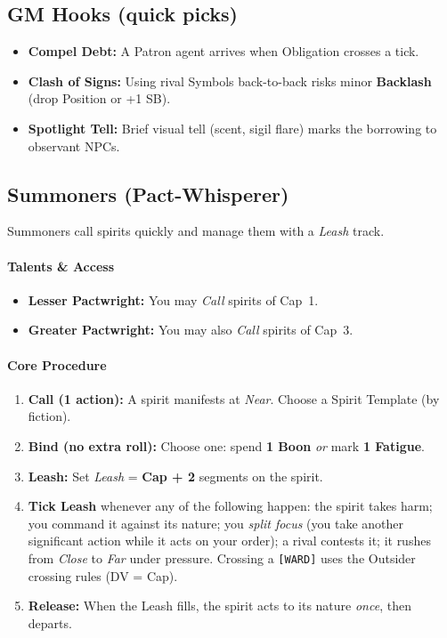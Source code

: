 \subsection*{GM Hooks (quick picks)}
\begin{itemize}
  \item \textbf{Compel Debt:} A Patron agent arrives when Obligation crosses a tick.
  \item \textbf{Clash of Signs:} Using rival Symbols back-to-back risks minor \textbf{Backlash} (drop Position or +1 SB).
  \item \textbf{Spotlight Tell:} Brief visual tell (scent, sigil flare) marks the borrowing to observant NPCs.
\end{itemize}

\subsection{Summoners (Pact-Whisperer)}
\label{subsec:summoners}

Summoners call spirits quickly and manage them with a \emph{Leash} track.

\paragraph{Talents \& Access}
\begin{itemize}
  \item \textbf{Lesser Pactwright:} You may \emph{Call} spirits of Cap~1.
  \item \textbf{Greater Pactwright:} You may also \emph{Call} spirits of Cap~3.
\end{itemize}

\paragraph{Core Procedure}
\begin{enumerate}
  \item \textbf{Call (1 action):} A spirit manifests at \textit{Near}. Choose a Spirit Template (by fiction).
  \item \textbf{Bind (no extra roll):} Choose one: spend \textbf{1 Boon} \emph{or} mark \textbf{1 Fatigue}.
  \item \textbf{Leash:} Set \textit{Leash} = \textbf{Cap + 2} segments on the spirit.
  \item \textbf{Tick Leash} whenever any of the following happen: the spirit takes harm; you command it against its nature; you \emph{split focus} (you take another significant action while it acts on your order); a rival contests it; it rushes from \textit{Close} to \textit{Far} under pressure. Crossing a \texttt{[WARD]} uses the Outsider crossing rules (DV = Cap).
  \item \textbf{Release:} When the Leash fills, the spirit acts to its nature \emph{once}, then departs.
\end{enumerate}

